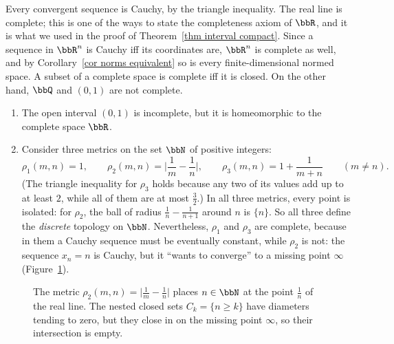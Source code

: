 Every convergent sequence is Cauchy, by the triangle inequality. The real line is complete; this is one of the ways to state the completeness axiom of $\bbR$, and it is what we used in the proof of Theorem~\ref{thm interval compact}. Since a sequence in $\bbR^n$ is Cauchy iff its coordinates are, $\bbR^n$ is complete as well, and by Corollary~\ref{cor norms equivalent} so is every finite-dimensional normed space. A subset of a complete space is complete iff it is closed. On the other hand, $\bbQ$ and $(0,1)$ are not complete.

\begin{example}\label{example N metrics}
    \begin{enumerate}
        \item The open interval $(0,1)$ is incomplete, but it is homeomorphic to the complete space $\bbR$.
        \item Consider three metrics on the set $\bbN$ of positive integers:
        \[\rho_1(m,n)=1,\qquad \rho_2(m,n)=\Big\lvert\frac1m-\frac1n\Big\rvert,\qquad \rho_3(m,n)=1+\frac{1}{m+n}\qquad (m\neq n).\]
        (The triangle inequality for $\rho_3$ holds because any two of its values add up to at least $2$, while all of them are at most $\frac32$.) In all three metrics, every point is isolated: for $\rho_2$, the ball of radius $\frac1n-\frac1{n+1}$ around $n$ is $\{n\}$. So all three define the \emph{discrete} topology on $\bbN$. Nevertheless, $\rho_1$ and $\rho_3$ are complete, because in them a Cauchy sequence must be eventually constant, while $\rho_2$ is not: the sequence $x_n=n$ is Cauchy, but it ``wants to converge'' to a missing point $\infty$ (Figure~\ref{fig N metric}).
    \end{enumerate}
\end{example}

\begin{figure}[tp]
    \centering
    \caption{The metric $\rho_2(m,n)=\lvert\frac1m-\frac1n\rvert$ places $n\in\bbN$ at the point $\frac1n$ of the real line. The nested closed sets $C_k=\{n\geq k\}$ have diameters tending to zero, but they close in on the missing point $\infty$, so their intersection is empty.}
    \label{fig N metric}
\end{figure}

